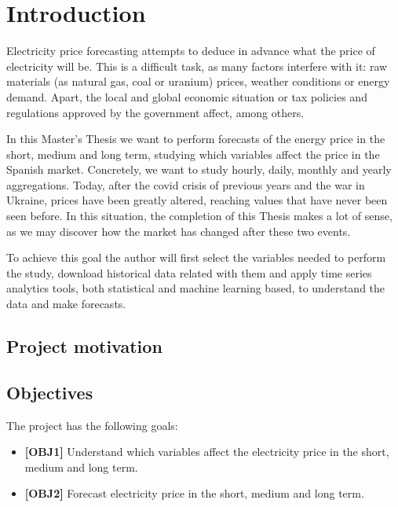 \chapter{Introduction}
Electricity price forecasting attempts to deduce in advance what the price of electricity will be.
This is a difficult task, as many factors interfere with it: raw materials (as natural gas, coal or uranium) prices, weather conditions or energy demand.
Apart, the local and global economic situation or tax policies and regulations approved by the government affect, among others.

In this Master's Thesis we want to perform forecasts of the energy price in the short, medium and long term, studying which variables affect the price in the Spanish market.
Concretely, we want to study hourly, daily, monthly and yearly aggregations.
Today, after the covid crisis of previous years and the war in Ukraine, prices have been greatly altered, reaching values that have never been seen before.
In this situation, the completion of this Thesis makes a lot of sense, as we may discover how the market has changed after these two events.

To achieve this goal the author will first select the variables needed to perform the study, download historical data related with them and apply time series analytics tools, both statistical and machine learning based, to understand the data and make forecasts.

\section{Project motivation}


\section{Objectives}
The project has the following goals:
\begin{itemize}
    \item \textbf{[OBJ1]} Understand which variables affect the electricity price in the short, medium and long term.
    \item \textbf{[OBJ2]} Forecast electricity price in the short, medium and long term.
\end{itemize}